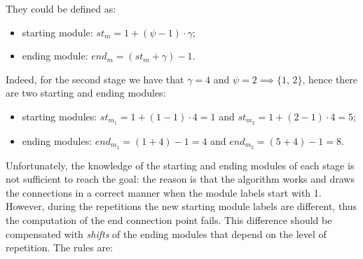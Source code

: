 \documentclass{ltxdoc}
\begin{document}
\begin{center}
{
}
\end{center}

They could be defined as:
\begin{itemize}
\item starting module: $st_m=1+(\psi-1)\cdot\gamma $;
\item ending module: $end_m=(st_m+\gamma)-1$.
\end{itemize}
Indeed, for the second stage we have that $\gamma=4$ and $\psi=2\implies \{1,\, 2\}$, hence there are two starting and ending modules:
\begin{itemize}
\item starting modules: $st_{m_1}=1+(1-1)\cdot 4=1$ and $st_{m_2}=1+(2-1)\cdot 4=5$;
\item ending modules:  $end_{m_1}=(1+4)-1=4$ and $end_{m_2}=(5+4)-1=8$.
\end{itemize}
Unfortunately, the knowledge of the starting and ending modules of each stage is not sufficient to reach the goal: the reason is that the algorithm works and draws the connections in a correct manner when the module labels start with 1. However, during the repetitions the new starting module labels are different, thus the computation of the end connection point fails. This difference should be compensated with \emph{shifts} of the ending modules that depend on the level of repetition. The rules are:
\end{document}
